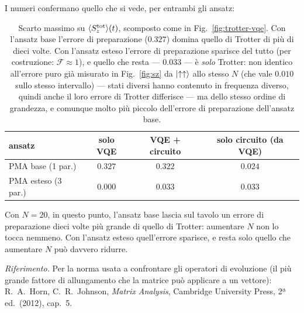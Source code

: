 \documentclass[11pt,a4paper]{article}
\begin{document}
\FloatBarrier

I numeri confermano quello che si vede, per entrambi gli ansatz:

\begin{table}[htbp]
\centering
\small
\renewcommand{\arraystretch}{1.3}
\begin{tabular}{@{}lccc@{}}
\toprule
\rowcolor{grigetto}
\textbf{ansatz} & \textbf{solo VQE} & \textbf{VQE + circuito} & \textbf{solo circuito (da VQE)} \\
\midrule
PMA base (1 par.) & $0.327$ & $0.322$ & $0.024$ \\
PMA esteso (3 par.) & $0.000$ & $0.033$ & $0.033$ \\
\bottomrule
\end{tabular}
\caption{Scarto massimo su $\langle S_z^{\rm tot}\rangle(t)$, scomposto come
in Fig.~\ref{fig:trotter-vqe}. Con l'ansatz base l'errore di preparazione
($0.327$) domina quello di Trotter di più di dieci volte. Con l'ansatz esteso
l'errore di preparazione sparisce del tutto (per costruzione: $\mathcal
F\approx1$), e quello che resta --- $0.033$ --- è \emph{solo} Trotter: non
identico all'errore puro già misurato in Fig.~\ref{fig:sz} da
$\lvert \uparrow\uparrow\rangle$ allo stesso $N$ (che vale $0.010$ sullo stesso
intervallo) --- stati diversi hanno contenuto in frequenza diverso, quindi
anche il loro errore di Trotter differisce --- ma dello stesso ordine di
grandezza, e comunque molto più piccolo dell'errore di preparazione
dell'ansatz base.}
\label{tab:doppio-errore}
\end{table}

\FloatBarrier

Con $N=20$, in questo punto, l'ansatz base lascia sul tavolo un errore di
preparazione dieci volte più grande di quello di Trotter: aumentare $N$ non
lo tocca nemmeno. Con l'ansatz esteso quell'errore sparisce, e resta solo
quello che aumentare $N$ può davvero ridurre.


\bigskip
\noindent\footnotesize\textit{Riferimento.} Per la norma usata a confrontare
gli operatori di evoluzione (il più grande fattore di allungamento che la
matrice può applicare a un vettore): R.~A.~Horn, C.~R.~Johnson, \emph{Matrix
Analysis}, Cambridge University Press, 2ª ed.\ (2012), cap.~5.
\end{document}
